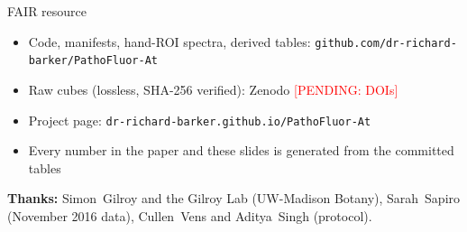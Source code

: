 \documentclass[aspectratio=169,10pt]{beamer}
\newcommand{\pending}[1]{\textcolor{red}{[PENDING: #1]}}
\begin{document}
\begin{frame}{FAIR resource}
  \begin{itemize}
    \item Code, manifests, hand-ROI spectra, derived tables: \texttt{github.com/dr-richard-barker/PathoFluor-At}
    \item Raw cubes (lossless, SHA-256 verified): Zenodo \pending{DOIs}
    \item Project page: \texttt{dr-richard-barker.github.io/PathoFluor-At}
    \item Every number in the paper and these slides is generated from the committed tables
  \end{itemize}
  \vfill
  {\small \textbf{Thanks:} Simon~Gilroy and the Gilroy Lab (UW-Madison Botany), Sarah~Sapiro
  (November 2016 data), Cullen~Vens and Aditya~Singh (protocol).}
\end{frame}
\end{document}
